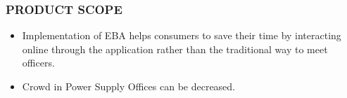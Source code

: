 \documentclass{beamer} %
\theoremstyle{definition} %
\begin{document}
	


\begin{frame}
\frametitle{PRODUCT SCOPE}
\begin{itemize}
	\item Implementation of EBA helps consumers to save their time by interacting online through the application rather than the traditional way to meet officers.
	\item Crowd in Power Supply Offices can be decreased.
	
	
	
	
\end{itemize}
\end{frame}
\end{document}
